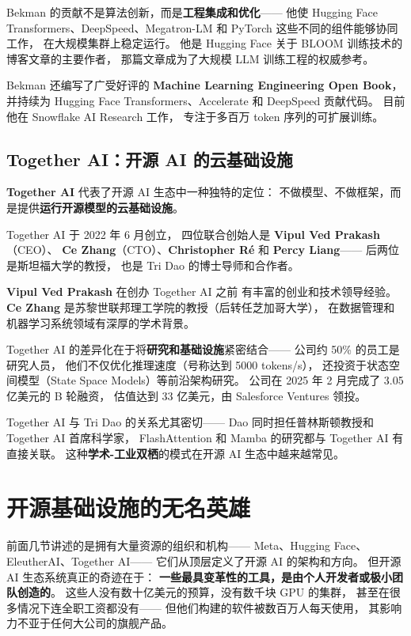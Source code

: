 Bekman 的贡献不是算法创新，而是\textbf{工程集成和优化}——
他使 Hugging Face Transformers、DeepSpeed、Megatron-LM
和 PyTorch 这些不同的组件能够协同工作，
在大规模集群上稳定运行。
他是 Hugging Face 关于 BLOOM 训练技术的博客文章的主要作者，
那篇文章成为了大规模 LLM 训练工程的权威参考。

Bekman 还编写了广受好评的 \textbf{Machine Learning Engineering Open Book}，
并持续为 Hugging Face Transformers、Accelerate 和 DeepSpeed 贡献代码。
目前他在 Snowflake AI Research 工作，
专注于多百万 token 序列的可扩展训练。

\subsection{Together AI：开源 AI 的云基础设施}

\textbf{Together AI} 代表了开源 AI 生态中一种独特的定位：
不做模型、不做框架，而是提供\textbf{运行开源模型的云基础设施}。

Together AI 于 2022 年 6 月创立，
四位联合创始人是 \textbf{Vipul Ved Prakash}（CEO）、
\textbf{Ce Zhang}（CTO）、\textbf{Christopher R\'e}
和 \textbf{Percy Liang}——
后两位是斯坦福大学的教授，
也是 Tri Dao 的博士导师和合作者。

\textbf{Vipul Ved Prakash} 在创办 Together AI 之前
有丰富的创业和技术领导经验。
\textbf{Ce Zhang} 是苏黎世联邦理工学院的教授（后转任芝加哥大学），
在数据管理和机器学习系统领域有深厚的学术背景。

Together AI 的差异化在于将\textbf{研究和基础设施}紧密结合——
公司约 50\% 的员工是研究人员，
他们不仅优化推理速度（号称达到 5000 tokens/s），
还投资于状态空间模型（State Space Models）等前沿架构研究。
公司在 2025 年 2 月完成了 3.05 亿美元的 B 轮融资，
估值达到 33 亿美元，由 Salesforce Ventures 领投。

Together AI 与 Tri Dao 的关系尤其密切——
Dao 同时担任普林斯顿教授和 Together AI 首席科学家，
FlashAttention 和 Mamba 的研究都与 Together AI 有直接关联。
这种\textbf{学术-工业双栖}的模式在开源 AI 生态中越来越常见。


\section{开源基础设施的无名英雄}
\label{sec:unsung-heroes}

前面几节讲述的是拥有大量资源的组织和机构——
Meta、Hugging Face、EleutherAI、Together AI——
它们从顶层定义了开源 AI 的架构和方向。
但开源 AI 生态系统真正的奇迹在于：
\textbf{一些最具变革性的工具，是由个人开发者或极小团队创造的}。
这些人没有数十亿美元的预算，没有数千块 GPU 的集群，
甚至在很多情况下连全职工资都没有——
但他们构建的软件被数百万人每天使用，
其影响力不亚于任何大公司的旗舰产品。

